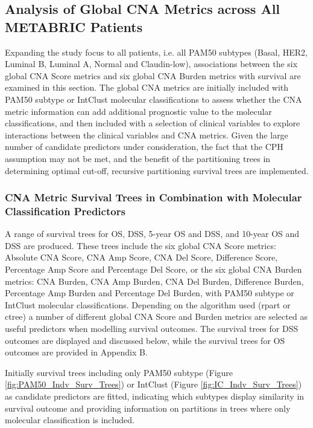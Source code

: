 \subsection{Analysis of Global CNA Metrics across All METABRIC Patients}
Expanding the study focus to all patients, i.e. all PAM50 subtypes (Basal, HER2, Luminal B, Luminal A, Normal and Claudin-low), associations between the six global CNA Score metrics and six global CNA Burden metrics with survival are examined in this section. The global CNA metrics are initially included with PAM50 subtype or IntClust molecular classifications to assess whether the CNA metric information can add additional prognostic value to the molecular classifications, and then included with a selection of clinical variables to explore interactions between the clinical variables and CNA metrics. Given the large number of candidate predictors under consideration, the fact that the CPH assumption may not be met, and the benefit of the partitioning trees in determining optimal cut-off, recursive partitioning survival trees are implemented. 

\subsubsection{CNA Metric Survival Trees in Combination with Molecular Classification Predictors} 
A range of survival trees for OS, DSS, 5-year OS and DSS, and 10-year OS and DSS are produced. These trees include the six global CNA Score metrics: Absolute CNA Score, CNA Amp Score, CNA Del Score, Difference Score, Percentage Amp Score and Percentage Del Score, or the six global CNA Burden metrics: CNA Burden, CNA Amp Burden, CNA Del Burden, Difference Burden, Percentage Amp Burden and Percentage Del Burden, with PAM50 subtype or IntClust molecular classifications. Depending on the algorithm used (rpart or ctree) a number of different global CNA Score and Burden metrics are selected as useful predictors when modelling survival outcomes. The survival trees for DSS outcomes are displayed and discussed below, while the survival trees for OS outcomes are provided in Appendix B. 

Initially survival trees including only PAM50 subtype (Figure \ref{fig:PAM50_Indv_Surv_Trees}) or IntClust (Figure \ref{fig:IC_Indv_Surv_Trees}) as candidate predictors are fitted, indicating which subtypes display similarity in survival outcome and providing information on partitions in trees where only molecular classification is included.

